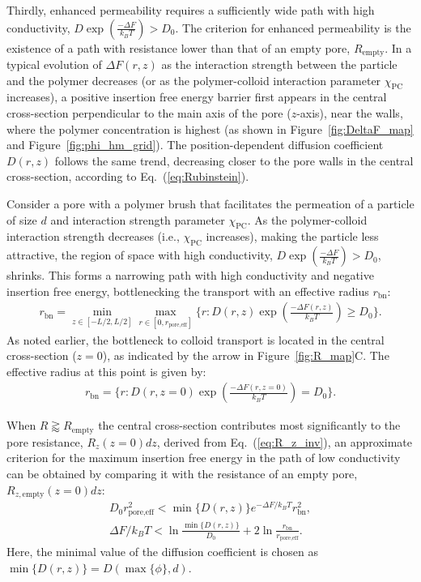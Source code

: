 \documentclass[12pt, a4paper]{article}
\begin{document}
Thirdly, enhanced permeability requires a sufficiently wide path with high conductivity, $D\exp\left(\frac{-\Delta F}{k_B T}\right) > D_0$.
The criterion for enhanced permeability is the existence of a path with resistance lower than that of an empty pore, $R_{\text{empty}}$.
In a typical evolution of $\Delta F(r,z)$ as the interaction strength between the particle and the polymer decreases (or as the polymer-colloid interaction parameter $\chi_{\text{PC}}$ increases), a positive insertion free energy barrier first appears in the central cross-section perpendicular to the main axis of the pore ($z$-axis), near the walls, where the polymer concentration is highest (as shown in Figure~\ref{fig:DeltaF_map} and Figure~\ref{fig:phi_hm_grid}).
The position-dependent diffusion coefficient $D(r,z)$ follows the same trend, decreasing closer to the pore walls in the central cross-section, according to Eq.~(\ref{eq:Rubinstein}).

Consider a pore with a polymer brush that facilitates the permeation of a particle of size $d$ and interaction strength parameter $\chi_{\text{PC}}$.
As the polymer-colloid interaction strength decreases (i.e., $\chi_{\text{PC}}$ increases), making the particle less attractive, the region of space with high conductivity, $D\exp\left(\frac{-\Delta F}{k_B T}\right) > D_0$, shrinks.
This forms a narrowing path with high conductivity and negative insertion free energy, bottlenecking the transport with an effective radius $r_{\text{bn}}$:
\begin{eqnarray}
    r_{\text{bn}} = \min_{z \in [-L/2, L/2]}\max_{r \in [0, r_{\text{pore,eff}}]}\{r : D(r, z)\exp\left(\frac{-\Delta F(r,z)}{k_B T}\right) \ge D_{0}\}.
\end{eqnarray}
As noted earlier, the bottleneck to colloid transport is located in the central cross-section ($z = 0$), as indicated by the arrow in Figure~\ref{fig:R_map}C. The effective radius at this point is given by:
\begin{eqnarray}
    r_{\text{bn}} = \{r : D(r, z=0)\exp\left(\frac{-\Delta F(r,z=0)}{k_B T}\right) = D_{0}\}.
\end{eqnarray}

When $R \gtrapprox R_{\text{empty}}$ the central cross-section contributes most significantly to the pore resistance, $R_{z}(z=0)dz$, derived from Eq.~(\ref{eq:R_z_inv}), an approximate criterion for the maximum insertion free energy in the path of low conductivity can be obtained by comparing it with the resistance of an empty pore, $R_{z, \text{empty}}(z=0)dz$:
\begin{eqnarray}
    D_0 r_{\text{pore,eff}}^{2} < \min\{D(r,z)\} e^{-\Delta F / k_B T} r_{\text{bn}}^2, \\
    \label{eq:max_energy_path}
    \Delta F / k_B T < \ln \frac{\min\{D(r,z)\}}{D_0} + 2 \ln \frac{r_{\text{bn}}}{r_{\text{pore,eff}}}.
\end{eqnarray}
Here, the minimal value of the diffusion coefficient is chosen as $\min\{D(r,z)\} = D(\max\{\phi\}, d)$.
\end{document}

